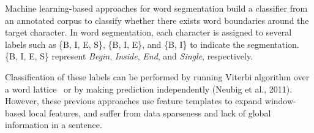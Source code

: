 \documentclass[11pt,letterpaper]{article}
\begin{document}
Machine learning-based approaches for word segmentation build a classifier from an annotated corpus to classify whether there exists word boundaries around the target character. 
In word segmentation, each character is assigned to several labels such as \{B, I, E, S\}, \{B, I, E\}, and \{B, I\} to indicate the segmentation. \{B, I, E, S\} represent {\it Begin}, {\it Inside}, {\it End}, and {\it Single}, respectively. 



Classification of these labels can be performed by running Viterbi algorithm over a word lattice~\cite{kudo-yamamoto-matsumoto:2004:EMNLP,nakagawa2004chinese,kaji-kitsuregawa:2013:IJCNLP} or by making prediction independently (Neubig et al., 2011). However, these previous approaches use feature templates to expand window-based local features, and suffer from data sparseness and lack of global information in a sentence. 
\end{document}
